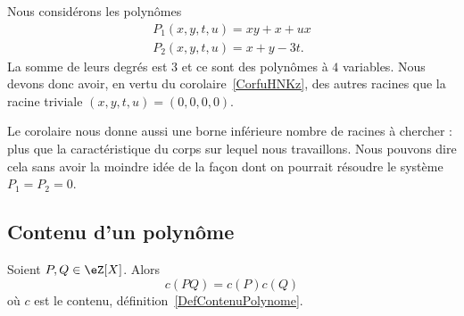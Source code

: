 \begin{example}
    Nous considérons les polynômes
    \begin{subequations}
        \begin{align}
            P_1(x,y,t,u)=xy+x+ux\\
            P_2(x,y,t,u)=x+y-3t.
        \end{align}
    \end{subequations}
    La somme de leurs degrés est \( 3\) et ce sont des polynômes à \( 4\) variables. Nous devons donc avoir, en vertu du corolaire~\ref{CorfuHNKz}, des autres racines que la racine triviale \( (x,y,t,u)=(0,0,0,0)\).

    Le corolaire nous donne aussi une borne inférieure nombre de racines à chercher : plus que la caractéristique du corps sur lequel nous travaillons. Nous pouvons dire cela sans avoir la moindre idée de la façon dont on pourrait résoudre le système \( P_1=P_2=0\).
\end{example}


\subsection{Contenu d'un polynôme}

\begin{lemma}   \label{LemHULrVaF}
    Soient \( P,Q\in \eZ[X]\). Alors
    \begin{equation}
        c(PQ)=c(P)c(Q)
    \end{equation}
    où \( c\) est le contenu, définition~\ref{DefContenuPolynome}.
\end{lemma}

